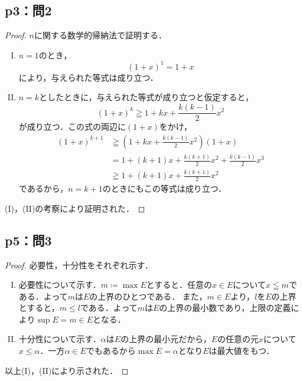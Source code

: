 \documentclass[uplatex,dvipdfmx,a4paper,10pt,fleqn]{jsarticle}
\newenvironment{tleftbar}{\begin{tbleftline}\setlength{\parindent}{1zw}}{\end{tbleftline}}
\begin{document}
\subsection*{p3：問2}

\begin{tleftbar}
    \begin{proof}
       $n$に関する数学的帰納法で証明する．
       \begin{enumerate}[(I)]
        \item $n=1$のとき，
        \[
            (1+x)^1 = 1+x
        \]
        により，与えられた等式は成り立つ．
        \item $n=k$としたときに，与えられた等式が成り立つと仮定すると，
        \[
            (1+x)^k \geqq 1+ kx + \frac{k(k-1)}{2} x^2 
        \]
        が成り立つ．この式の両辺に$(1+x)$をかけ，
        \begin{align*} 
            (1+x)^{k+1}  & \geqq \left ( 1+ kx + \frac{k(k-1)}{2} x^2 \right ) (1+x) \\
            & = 1+(k+1)x + \frac{k(k+1)}{2} x^2 + \frac{k(k-1)}{2} x^3 \\
            & \geqq 1+(k+1)x + \frac{k(k+1)}{2} x^2 
        \end{align*}
        であるから，$n =k+1$のときにもこの等式は成り立つ．
       \end{enumerate}
       (I)，(II)の考察により証明された．
    \end{proof}
\end{tleftbar}

\newpage 



\subsection*{p5：問3}

\begin{tleftbar}
    \begin{proof}
        必要性，十分性をそれぞれ示す．
        \begin{enumerate}[(I)]
            \item 必要性について示す．$m \coloneqq \max E$とすると．任意の$ x \in E$について$x \leqq m$である．よって$m$は$E$の上界のひとつである．
            また，$m \in E$より，$l$を$E$の上界とすると，$m \le l$である．よって$m$は$E$の上界の最小数であり，上限の定義により$\sup E = m \in E$となる．
            \item 十分性について示す．$\alpha$は$E$の上界の最小元だから，$E$の任意の元$x$について$x \le \alpha $．一方$\alpha  \in E$でもあるから$\max E = \alpha$となり$E$は最大値をもつ．
        \end{enumerate}
        以上(I)，(II)により示された．
    \end{proof}
    \end{tleftbar}
\end{document}
